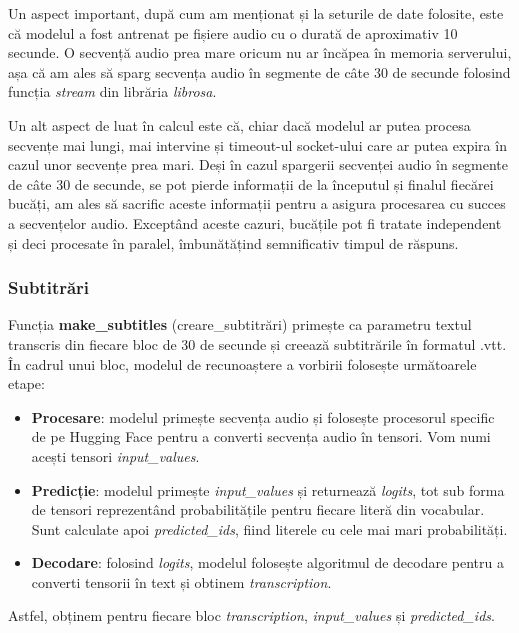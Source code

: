 \par
Un aspect important, după cum am menționat și la seturile de date folosite, este că modelul a fost
antrenat pe fișiere audio cu o durată de aproximativ 10 secunde. O secvență audio prea mare oricum
nu ar încăpea în memoria serverului, așa că am ales să sparg secvența audio în segmente de câte 30 de
secunde folosind funcția \textit{stream} din librăria \textit{librosa}.

\par
Un alt aspect de luat în calcul este că, chiar dacă modelul ar putea procesa secvențe mai lungi, mai
intervine și timeout-ul socket-ului care ar putea expira în cazul unor secvențe prea mari. Deși în
cazul spargerii secvenței audio în segmente de câte 30 de secunde, se pot pierde informații de 
la începutul și finalul fiecărei bucăți, am ales să sacrific aceste informații pentru a asigura
procesarea cu succes a secvențelor audio. Exceptând aceste cazuri, bucățile pot fi tratate independent
și deci procesate în paralel, îmbunătățind semnificativ timpul de răspuns.

\subsubsection{Subtitrări}
\label{subsec:subtitles}
\par
Funcția \textbf{make\_subtitles} (creare\_subtitrări) primește ca parametru textul transcris din fiecare bloc de 30 de secunde
și creează subtitrările în formatul .vtt. În cadrul unui bloc, modelul de recunoaștere a vorbirii 
folosește următoarele etape:
\begin{itemize}
    \item \textbf{Procesare}: modelul primește secvența audio și folosește procesorul specific de pe
    Hugging Face pentru a converti secvența audio în tensori. Vom numi acești tensori \textit{input\_values}.
    \item \textbf{Predicție}: modelul primește \textit{input\_values} și returnează \textit{logits}, tot
    sub forma de tensori reprezentând probabilitățile pentru fiecare literă din vocabular. Sunt calculate
    apoi \textit{predicted\_ids}, fiind literele cu cele mai mari probabilități.
    \item \textbf{Decodare}: folosind \textit{logits}, modelul folosește algoritmul de decodare pentru a
    converti tensorii în text și obtinem \textit{transcription}.
\end{itemize}

Astfel, obținem pentru fiecare bloc \textit{transcription}, \textit{input\_values} și \textit{predicted\_ids}.

